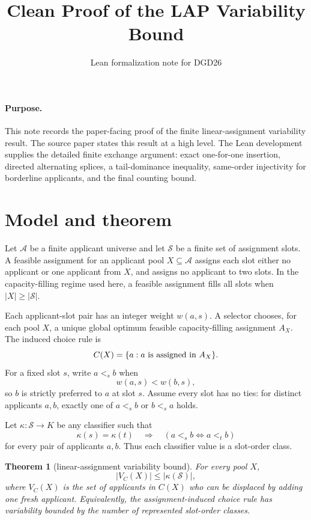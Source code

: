\documentclass[11pt]{article}
\title{Clean Proof of the LAP Variability Bound}
\author{Lean formalization note for DGD26}
\date{}
\newtheorem{theorem}{Theorem}
\newcommand{\Applicants}{\mathcal A}
\newcommand{\Slots}{\mathcal S}
\newcommand{\chosen}{C}
\newcommand{\border}{V_{\chosen}}
\newcommand{\weight}{w}
\newcommand{\class}{\kappa}
\begin{document}
\maketitle

\paragraph{Purpose.}
This note records the paper-facing proof of the finite linear-assignment
variability result.  The source paper states this result at a high level.  The
Lean development supplies the detailed finite exchange argument: exact
one-for-one insertion, directed alternating splices, a tail-dominance inequality,
same-order injectivity for borderline applicants, and the final counting bound.

\section*{Model and theorem}

Let $\Applicants$ be a finite applicant universe and let $\Slots$ be a finite
set of assignment slots.  A feasible assignment for an applicant pool
$X \subseteq \Applicants$ assigns each slot either no applicant or one applicant
from $X$, and assigns no applicant to two slots.  In the capacity-filling regime
used here, a feasible assignment fills all slots when $|X| \ge |\Slots|$.

Each applicant-slot pair has an integer weight $\weight(a,s)$.  A selector
chooses, for each pool $X$, a unique global optimum feasible capacity-filling
assignment $A_X$.  The induced choice rule is
\[
  \chosen(X) = \{a : a \hbox{ is assigned in } A_X\}.
\]
For a fixed slot $s$, write $a <_s b$ when
\[
  \weight(a,s) < \weight(b,s),
\]
so $b$ is strictly preferred to $a$ at slot $s$.  Assume every slot has no ties:
for distinct applicants $a,b$, exactly one of $a <_s b$ or $b <_s a$ holds.

Let $\class : \Slots \to K$ be any classifier such that
\[
  \class(s)=\class(t)
  \quad\Longrightarrow\quad
  (a <_s b \iff a <_t b)
\]
for every pair of applicants $a,b$.  Thus each classifier value is a slot-order
class.

\begin{theorem}[linear-assignment variability bound]
For every pool $X$,
\[
  |\border(X)| \le |\class(\Slots)|,
\]
where $\border(X)$ is the set of applicants in $\chosen(X)$ who can be displaced
by adding one fresh applicant.  Equivalently, the assignment-induced choice rule
has variability bounded by the number of represented slot-order classes.
\end{theorem}
\end{document}
